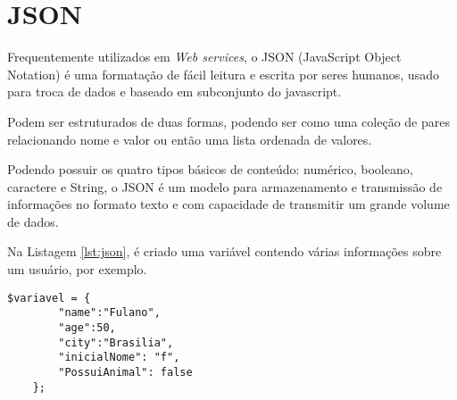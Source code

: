 



\section{JSON}
Frequentemente utilizados em \textit{Web services}, o JSON (JavaScript Object Notation) é uma formatação de fácil leitura e escrita por seres humanos, usado para troca de dados e baseado em subconjunto do javascript.

Podem ser estruturados de duas formas, podendo ser como uma coleção de pares relacionando nome e valor ou então uma lista ordenada de valores. 

Podendo possuir os quatro tipos básicos de conteúdo: numérico, booleano, caractere e String, o JSON é um modelo para armazenamento e transmissão de informações no formato texto e com capacidade de transmitir um grande volume de dados.

Na Listagem \ref{lst:json}, é criado uma variável contendo várias informações sobre um usuário, por exemplo. 

\begin{lstlisting}[caption={Exemplo de JSON},label={lst:json}]
	$variavel = { 
		"name":"Fulano", 
		"age":50, 
		"city":"Brasilia",
		"inicialNome": "f",
		"PossuiAnimal": false
	};
\end{lstlisting}


